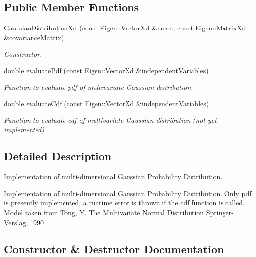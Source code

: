 \subsection*{Public Member Functions}
\begin{DoxyCompactItemize}
\item 
\hyperlink{classtudat_1_1statistics_1_1GaussianDistributionXd_ab8ead3736954d1f2e4fcb914bd25f8b9}{Gaussian\+Distribution\+Xd} (const Eigen\+::\+Vector\+Xd \&mean, const Eigen\+::\+Matrix\+Xd \&covariance\+Matrix)
\begin{DoxyCompactList}\small\item\em Constructor. \end{DoxyCompactList}\item 
double \hyperlink{classtudat_1_1statistics_1_1GaussianDistributionXd_a8b09ee64c8fe4ddb15bdba86b9eb5a5a}{evaluate\+Pdf} (const Eigen\+::\+Vector\+Xd \&independent\+Variables)
\begin{DoxyCompactList}\small\item\em Function to evaluate pdf of multivariate Gaussian distribution. \end{DoxyCompactList}\item 
double \hyperlink{classtudat_1_1statistics_1_1GaussianDistributionXd_a35b5b2168a1856aa4f93fca963c430e1}{evaluate\+Cdf} (const Eigen\+::\+Vector\+Xd \&independent\+Variables)
\begin{DoxyCompactList}\small\item\em Function to evaluate cdf of multivariate Gaussian distribution (not yet implemented) \end{DoxyCompactList}\end{DoxyCompactItemize}


\subsection{Detailed Description}
Implementation of multi-\/dimensional Gaussian Probability Distribution. 

Implementation of multi-\/dimensional Gaussian Probability Distribution. Only pdf is presently implemented, a runtime error is thrown if the cdf function is called. Model taken from Tong, Y. The Multivariate Normal Distribution Springer-\/\+Verslag, 1990 

\subsection{Constructor \& Destructor Documentation}
